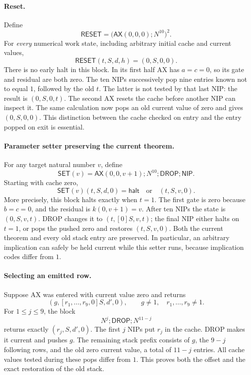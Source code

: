 \paragraph{Reset.}
Define
\[
 \mathsf{RESET}
  =\bigl(\mathsf{AX}(0,0,0);N^{10}\bigr)^2.
\]
For \emph{every} numerical work state, including arbitrary initial cache
and current values,
\[
 \mathsf{RESET}(t,S,d,h)=(0,S,0,0).
\]
There is no early halt in this block.  In its first half AX has $a=c=0$,
so its gate and residual are both zero.  The ten NIPs successively pop nine
entries known not to equal $1$, followed by the old $t$.  The latter is not
tested by that last NIP: the result is $(0,S,0,t)$.  The second AX resets
the cache before another NIP can inspect it.  The same calculation now pops
an old current value of zero and gives $(0,S,0,0)$.  This distinction between
the cache checked on entry and the entry popped on exit is essential.

\paragraph{Parameter setter preserving the current theorem.}
For any target natural number $v$, define
\[
 \mathsf{SET}(v)=
 \mathsf{AX}(0,0,v+1);N^{10};\mathsf{DROP};\mathsf{NIP}.
\]
Starting with cache zero,
\[
 \mathsf{SET}(v)(t,S,d,0)
  =\mathsf{halt}\quad\text{or}\quad(t,S,v,0).
\]
More precisely, this block halts exactly when $t=1$.  The first gate is zero
because $b=c=0$, and the residual is
$k(0,v+1)=v$.  After ten NIPs the state is $(0,S,v,t)$.  DROP changes it to
$(t,[0]S,v,t)$; the final NIP either halts on $t=1$, or pops the pushed zero
and restores $(t,S,v,0)$.  Both the current theorem and every old stack entry
are preserved.  In particular, an arbitrary implication can safely be held
current while this setter runs, because implication codes differ from $1$.

\paragraph{Selecting an emitted row.}
Suppose AX was entered with current value zero and returns
\[
 (g,[r_1,\ldots,r_9,0]S,d',0),\qquad
 g\ne1,\quad r_1,\ldots,r_9\ne1.
\]
For $1\le j\le9$, the block
\[
 N^j;\mathsf{DROP};N^{11-j}
\]
returns exactly $(r_j,S,d',0)$.  The first $j$ NIPs put $r_j$ in the cache.
DROP makes it current and pushes $g$.  The remaining stack prefix consists
of $g$, the $9-j$ following rows, and the old zero current value, a total
of $11-j$ entries.  All cache values tested during these pops differ from
$1$.  This proves both the offset and the exact restoration of the old
stack.

